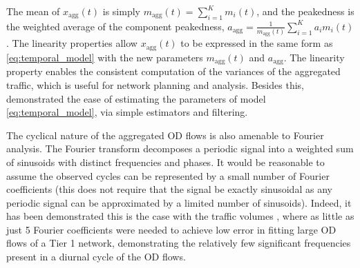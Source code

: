 \noindent The mean of $x_{\text{agg}}(t)$ is simply $m_{\text{agg}}(t)
= \sum_{i=1}^K m_i(t)$, and the peakedness is the weighted average of
the component peakedness, $a_{\text{agg}} =
\tfrac{1}{m_{\text{agg}}(t)} \sum_{i=1}^K a_i m_i(t)$. The linearity
properties allow $x_{\text{agg}}(t)$ to be expressed in the same form
as \autoref{eq:temporal_model} with the new parameters
$m_{\text{agg}}(t)$ and $a_{\text{agg}}$. The linearity property
enables the consistent computation of the variances of the aggregated
traffic, which is useful for network planning and analysis. Besides
this, \cite{Roughan02BRvariable} demonstrated the ease of estimating
the parameters of model \autoref{eq:temporal_model}, via simple
estimators and filtering.

The cyclical nature of the aggregated OD flows is also amenable to
Fourier analysis. The Fourier transform decomposes a periodic signal
into a weighted sum of sinusoids with distinct frequencies and
phases. It would be reasonable to assume the observed cycles can be
represented by a small number of Fourier coefficients (this does not
require that the signal be exactly sinusoidal as any periodic signal
can be approximated by a limited number of sinusoids). Indeed, it has
been demonstrated this is the case with the traffic volumes
\cite{Soule04TMLargest,eriksson10:_basis}, where as little as just
5 Fourier coefficients were needed to achieve low error in fitting
large OD flows of a Tier 1 network, demonstrating the relatively few
significant frequencies present in a diurnal cycle of the OD
flows. 


